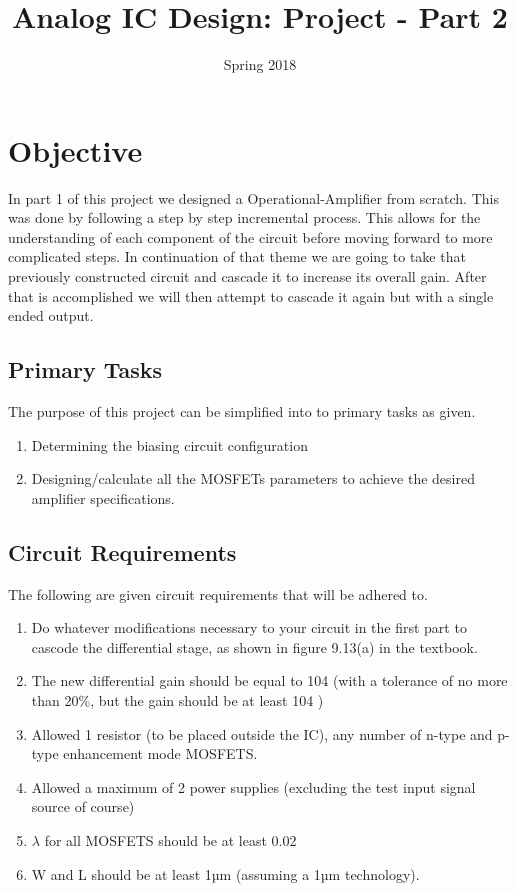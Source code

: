 \documentclass[12pt]{article}
\begin{document}
	
	\title{Analog IC Design: Project - Part 2}
	\date{Spring 2018}
	\maketitle
	\tableofcontents
	
	\newpage
	\section{Objective}
	
	In part 1 of this project we designed a Operational-Amplifier from scratch. This was done by following a step by step incremental process. This allows for the understanding of each component of the circuit before moving forward to more complicated steps. In continuation of that theme we are going to take that previously constructed circuit and cascade it to increase its overall gain. After that is accomplished we will then attempt to cascade it again but with a single ended output.
	
	\subsection{Primary Tasks}
	The purpose of this project can be simplified into to primary tasks as given.
	\begin{enumerate}
		\item Determining the biasing circuit configuration
		\item Designing/calculate all the MOSFETs parameters to achieve the desired amplifier
		specifications.
	\end{enumerate}
	
	\subsection{Circuit Requirements}
	The following are given circuit requirements that will be adhered to.
	
	\begin{enumerate}
		\item Do whatever modifications necessary to your circuit in the first part to cascode the
		differential stage, as shown in figure 9.13(a) in the textbook.
		\item The new differential gain should be equal to 104
		(with a tolerance of no more than
		20\%, but the gain should be at least 104
		)
		\item Allowed 1 resistor (to be placed outside the IC), any number of n-type and
		p-type enhancement mode MOSFETS.
		\item Allowed a maximum of 2 power supplies (excluding the test input signal source
		of course)
		\item $\lambda$ for all MOSFETS should be at least 0.02
		\item W and L should be at least 1µm (assuming a 1µm technology).
	\end{enumerate}
	
\end{document}
